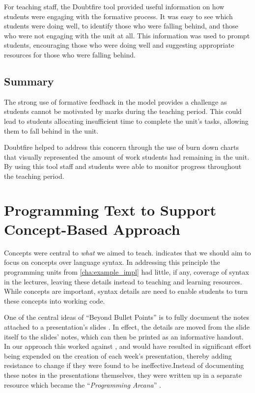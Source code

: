 For teaching staff, the Doubtfire tool provided useful information on how students were engaging with the formative process. It was easy to see which students were doing well, to identify those who were falling behind, and those who were not engaging with the unit at all. This information was used to prompt students, encouraging those who were doing well and suggesting appropriate resources for those who were falling behind.

\subsection{Summary} %
\label{sub:doubtfire_summary}

The strong use of formative feedback in the model provides a challenge as students cannot be motivated by marks during the teaching period. This could lead to students allocating insufficient time to complete the unit's tasks, allowing them to fall behind in the unit.

Doubtfire helped to address this concern through the use of burn down charts that visually represented the amount of work students had remaining in the unit. By using this tool staff and students were able to monitor progress throughout the teaching period.



\section{Programming Text to Support Concept-Based Approach} %
\label{sec:arcana}

Concepts were central to \emph{what} we aimed to teach.  indicates that we should aim to focus on concepts over language syntax. In addressing this principle the programming units from \cref{cha:example_impl} had little, if any, coverage of syntax in the lectures, leaving these details instead to teaching and learning resources. While concepts are important, syntax details are need to enable students to turn these concepts into working code.

One of the central ideas of ``Beyond Bullet Points'' is to fully document the notes attached to a presentation's slides \cite{Atkinson:2007}. In effect, the details are moved from the slide itself to the slides' notes, which can then be printed as an informative handout. In our approach this worked against , and would have resulted in significant effort being expended on the creation of each week's presentation, thereby adding resistance to change if they were found to be ineffective.Instead of documenting these notes in the presentations themselves, they were written up in a separate resource which became the ``\emph{Programming Arcana}'' \cite{Cain:2013arcana}.


